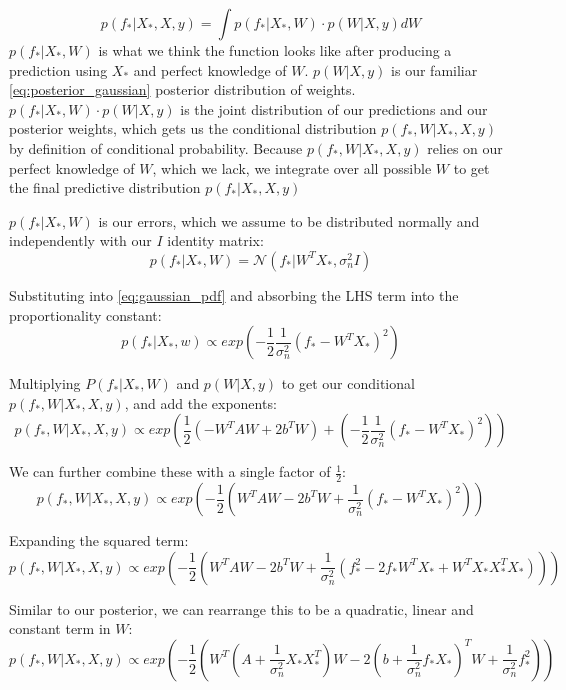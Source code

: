 \documentclass[10pt]{article}
\begin{document}
\begin{equation*}
    p(f_*|X_*,X,y) = \int p(f_*|X_*,W) \cdot p(W | X,y)dW
\end{equation*}
$p(f_*|X_*,W)$ is what we think the function looks like after producing a prediction using $X_*$ and perfect knowledge of $W$. $p(W|X,y)$ is our familiar \ref{eq:posterior_gaussian} posterior distribution of weights. $p(f_*|X_*,W) \cdot p(W|X,y)$ is the joint distribution of our predictions and our posterior weights, which gets us the conditional distribution $p(f_*,W|X_*,X,y)$ by definition of conditional probability. Because $p(f_*,W|X_*,X,y)$ relies on our perfect knowledge of $W$, which we lack, we integrate over all possible $W$ to get the final predictive distribution $p(f_*|X_*,X,y)$
    
 $p(f_*|X_*,W)$ is our errors, which we assume to be distributed normally and independently with our $I$ identity matrix:
\begin{equation*}
    p(f_* | X_*, W) = \mathcal{N}(f_* | W^TX_*, \sigma^2_nI)
\end{equation*}

Substituting into \ref{eq:gaussian_pdf} and absorbing the LHS term into the proportionality constant:
\begin{equation*}
    p(f_*|X_*,w) \propto exp\left(-\frac{1}{2}\frac{1}{\sigma^2_n}(f_* - W^TX_*)^2\right)
\end{equation*}

Multiplying $P(f_*|X_*,W)$ and $p(W|X,y)$ to get our conditional $p(f_*, W|X_*,X,y)$, and add the exponents: 
\begin{equation*}
    p(f_*,W|X_*,X,y) \propto exp\left(\frac{1}{2}(-W^TAW + 2b^TW) + \left(-\frac{1}{2}\frac{1}{\sigma^2_n}(f_* - W^TX_*)^2\right)\right)
\end{equation*}

We can further combine these with a single factor of $\frac{1}{2}$:
\begin{equation*}
    p(f_*,W|X_*,X,y) \propto exp\left(-\frac{1}{2}\left(W^TAW - 2b^TW + \frac{1}{\sigma^2_n}(f_* - W^TX_*)^2\right)\right)
\end{equation*}

Expanding the squared term:
\begin{equation*}
    p(f_*,W|X_*,X,y) \propto exp\left(-\frac{1}{2}\left(W^TAW - 2b^TW + \frac{1}{\sigma^2_n}(f_*^2 - 2f_*W^TX_* + W^TX_*X_*^TX_*)\right)\right)
\end{equation*}

Similar to our posterior, we can rearrange this to be a quadratic, linear and constant term in $W$:
\begin{equation*}
    p(f_*,W|X_*,X,y) \propto exp\left(-\frac{1}{2}\left(W^T\left(A + \frac{1}{\sigma^2_n}X_*X_*^T\right)W - 2\left(b + \frac{1}{\sigma^2_n}f_*X_*\right)^TW + \frac{1}{\sigma_n^2}f_*^2\right)\right)
\end{equation*}
\end{document}
